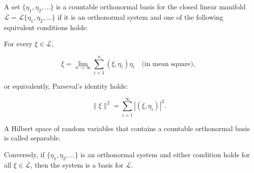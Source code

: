 A set $\{\eta_1, \eta_2, \ldots\}$ is a countable orthonormal basis for the closed linear manifold $\overline{\mathcal{L}} = \overline{\mathcal{L}}\{\eta_1, \eta_2, \ldots\}$ if it is an orthonormal system and one of the following equivalent conditions holds:

For every $\xi \in \overline{\mathcal{L}}$,

$$\xi = \lim_{n \to \infty} \sum_{i=1}^{n} (\xi, \eta_i) \eta_i \quad \text{(in mean square)},$$

or equivalently, Parseval's identity holds:

$$\|\xi\|^2 = \sum_{i=1}^{\infty} |(\xi, \eta_i)|^2.$$

A Hilbert space of random variables that contains a countable orthonormal basis is called separable.

Conversely, if $\{\eta_1, \eta_2, \ldots\}$ is an orthonormal system and either condition holds for all $\xi \in \overline{\mathcal{L}}$, then the system is a basis for $\overline{\mathcal{L}}$.
